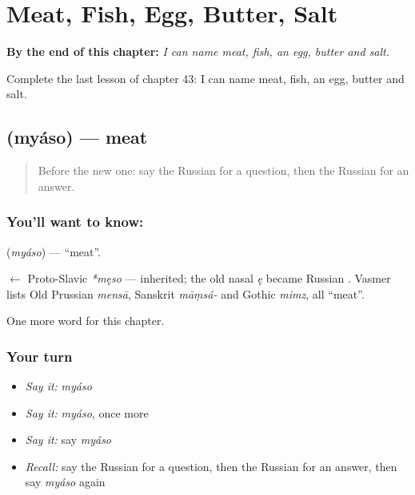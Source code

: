 
\chapter{Meat, Fish, Egg, Butter, Salt}
\label{ch:ru-meat-fish-egg-butter-salt}

\begin{chapteropening}
\textbf{By the end of this chapter:} \emph{I can name meat, fish, an egg, butter and salt.}

Complete the last lesson of chapter 43: I can name meat, fish, an egg, butter and salt.
\end{chapteropening}

\section[\texorpdfstring{\ru{мясо} (myáso)}{мясо (myáso)}]{ (myáso) — meat}

\label{lesson:RU-C43-meat}



\begin{quote}
Before the new one: say the Russian for a question, then the Russian for an answer.
\end{quote}

\subsection*{You'll want to know: }
\textbf{} (\emph{myáso}) — \textquotedblleft{}meat\textquotedblright{}.

\begin{cousinweb}
\textbf{} $\leftarrow$ Proto-Slavic \emph{*męso} — inherited; the old nasal \emph{ę} became Russian \emph{}. Vasmer lists Old Prussian \emph{mensā}, Sanskrit \emph{māṃsá-} and Gothic \emph{mimz}, all \textquotedblleft{}meat\textquotedblright{}.
\end{cousinweb}

\begin{grammarlens}[title={What you've built}]
One more word for this chapter.
\end{grammarlens}

\subsection*{Your turn}
\begin{itemize}
\raggedright
  \item \emph{Say it:} \emph{myáso}
  \item \emph{Say it:} \emph{myáso}, once more
  \item \emph{Say it:} say \emph{myáso}
  \item \emph{Recall:} say the Russian for a question, then the Russian for an answer, then say \emph{myáso} again
\end{itemize}

